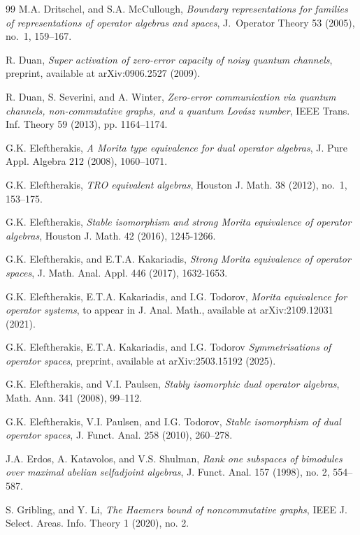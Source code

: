 \documentclass[11pt]{amsart}
\numberwithin{equation}{section}
\theoremstyle{plain}
\theoremstyle{definition}
\theoremstyle{remark}
\begin{document}
\begin{thebibliography}{99}
{\sc M.A. Dritschel, and S.A. McCullough},
{\it Boundary representations for families of representations of operator algebras and spaces}, 
{\rm J.\ Operator Theory 53 (2005), no.\ 1, 159--167.}

{\sc R. Duan},
{\it Super activation of zero-error capacity of noisy quantum channels},
{\rm preprint, available at arXiv:0906.2527 (2009).}

{\sc R. Duan, S. Severini, and A. Winter}, 
{\it Zero-error communication via quantum channels, non-commutative graphs, and a quantum Lovász number}, 
{\rm IEEE Trans. Inf. Theory 59 (2013), pp. 1164–1174.}

{\sc G.K. Eleftherakis}, 
{\it A Morita type equivalence for dual operator algebras},
{\rm J. Pure Appl. Algebra 212 (2008), 1060--1071.}

{\sc G.K. Eleftherakis},
{\it TRO equivalent algebras},
{\rm Houston J. Math. 38 (2012), no.\ 1, 153--175.}

{\sc G.K. Eleftherakis}, 
{\it Stable isomorphism and strong Morita equivalence of operator algebras},
{\rm Houston J. Math. 42 (2016), 1245-1266.}

{\sc G.K. Eleftherakis, and E.T.A. Kakariadis}, 
{\it Strong Morita equivalence of operator spaces},
{\rm J. Math. Anal. Appl. 446 (2017), 1632-1653.}

{\sc G.K. Eleftherakis, E.T.A. Kakariadis, and I.G. Todorov}, 
{\it Morita equivalence for operator systems}, {\rm to appear in J. Anal. Math., available at arXiv:2109.12031 (2021).}

{\sc G.K. Eleftherakis, E.T.A. Kakariadis, and I.G. Todorov}
{\it Symmetrisations of operator spaces},
{\rm preprint, available at  arXiv:2503.15192 (2025).}

{\sc G.K. Eleftherakis, and V.I. Paulsen}, 
{\it Stably isomorphic dual operator algebras},
{\rm Math. Ann. 341 (2008), 99--112.}

{\sc G.K. Eleftherakis, V.I. Paulsen, and I.G. Todorov}, 
{\it Stable isomorphism of dual operator spaces},
{\rm J. Funct. Anal. 258 (2010), 260--278.}

{\sc J.A. Erdos, A. Katavolos, and V.S. Shulman}, 
{\it Rank one subspaces of bimodules over maximal abelian selfadjoint algebras},
{\rm J. Funct. Anal. 157 (1998), no. 2, 554--587.}

{\sc S. Gribling, and Y. Li},
{\it The Haemers bound of noncommutative graphs},
{\rm IEEE J. Select. Areas. Info. Theory 1 (2020), no. 2.}


\end{thebibliography}
\end{document}

